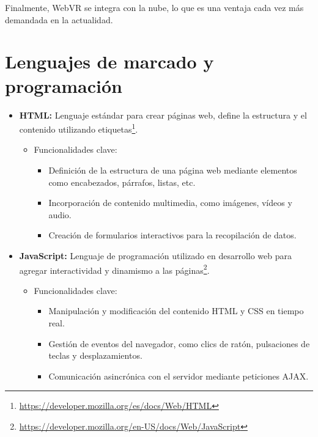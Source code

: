 \documentclass[a4paper, 12pt]{book}
\begin{document}
\bigskip

Finalmente, WebVR se integra con la nube, lo que es una ventaja cada vez más demandada en la actualidad.


\section{Lenguajes de marcado y programación} 
\label{sec:lenguajes}

\begin{itemize}
  \item \textbf{HTML:} Lenguaje estándar para crear páginas web, define la estructura y el contenido utilizando etiquetas\footnote{\url{https://developer.mozilla.org/es/docs/Web/HTML}}.
    \begin{itemize}
        \item Funcionalidades clave:
        \begin{itemize}
            \item Definición de la estructura de una página web mediante elementos como encabezados, párrafos, listas, etc.
            \item Incorporación de contenido multimedia, como imágenes, vídeos y audio.
            \item Creación de formularios interactivos para la recopilación de datos.
        \end{itemize}
    \end{itemize}
  
  \item \textbf{JavaScript:} Lenguaje de programación utilizado en desarrollo web para agregar interactividad y dinamismo a las páginas\footnote{\url{https://developer.mozilla.org/en-US/docs/Web/JavaScript}}.
    \begin{itemize}
        \item Funcionalidades clave:
        \begin{itemize}
            \item Manipulación y modificación del contenido HTML y CSS en tiempo real.
            \item Gestión de eventos del navegador, como clics de ratón, pulsaciones de teclas y desplazamientos.
            \item Comunicación asincrónica con el servidor mediante peticiones AJAX.
        \end{itemize}
    \end{itemize}
  

\end{itemize}
\end{document}
